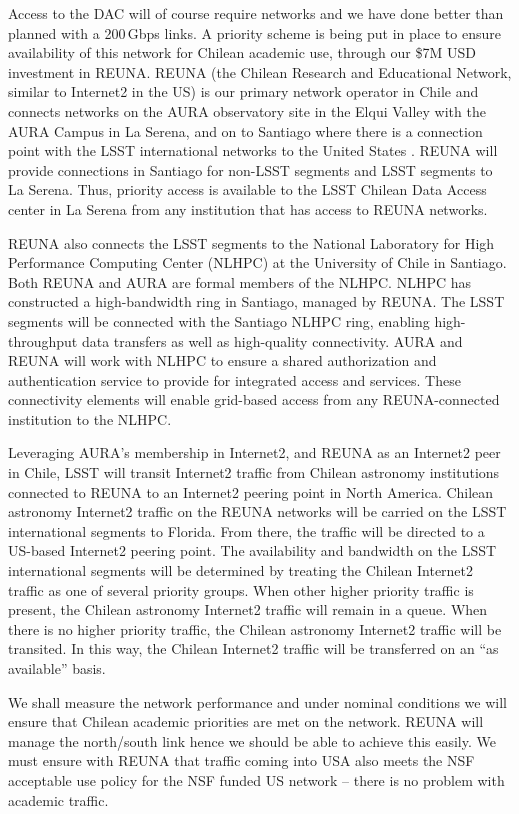 Access to the DAC will of course require networks and we have done better than planned with a 200\,Gbps links.
A priority scheme is being put in place to ensure availability of this network  for Chilean academic use, through our \$7M USD investment in REUNA.
REUNA (the Chilean Research and Educational Network, similar to Internet2 in the US) is our primary network operator in Chile and connects networks on the AURA observatory site in the Elqui Valley with the AURA Campus in La Serena, and on to Santiago where there is a connection point with the LSST international networks to the United States .
REUNA will provide connections in Santiago for non-LSST segments and LSST segments to La Serena.
Thus, priority access is available to the LSST Chilean Data Access center in La Serena from any institution that has access to REUNA networks.

REUNA also connects the LSST segments to the National Laboratory for High Performance Computing Center (NLHPC) at the University of Chile in Santiago.
Both REUNA and AURA are formal members of the NLHPC.
NLHPC has constructed a high-bandwidth ring in Santiago, managed by REUNA.
The LSST segments will be connected with the Santiago NLHPC ring, enabling high-throughput data transfers as well as high-quality connectivity.
AURA and REUNA will work with NLHPC to ensure a shared authorization and authentication service to provide for integrated access and services.
These connectivity elements will enable grid-based access from any REUNA-connected institution to the NLHPC.

Leveraging AURA’s membership in Internet2, and REUNA as an Internet2 peer in Chile, LSST will transit Internet2 traffic from Chilean astronomy institutions connected to REUNA to an Internet2 peering point in North America.
Chilean astronomy Internet2 traffic on the REUNA networks will be carried on the LSST international segments to Florida.
From there, the traffic will be directed to a US-based Internet2 peering point.
The availability and bandwidth on the LSST international segments will be determined by treating the Chilean Internet2 traffic as one of several priority groups.
When other higher priority traffic is present, the Chilean astronomy Internet2 traffic will remain in a queue.
When there is no higher priority traffic, the Chilean astronomy Internet2 traffic will be transited.
In this way, the Chilean Internet2 traffic will be transferred on an ``as available'' basis.

We shall measure the network performance and under nominal conditions we will ensure that Chilean academic priorities are met on the network.
REUNA will manage the north/south link hence we should be able to achieve this easily.
We must ensure with REUNA that traffic coming into USA also meets the NSF acceptable use policy for the NSF funded US network -- there is no problem with academic traffic.


